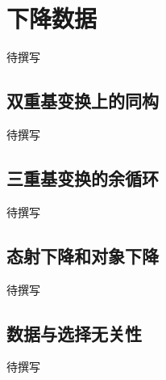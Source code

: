 
% 
% 

\section{下降数据}
\label{g5:sec:1601}

待撰写

\subsection{双重基变换上的同构}
\label{g5:subsec:1601:01}
待撰写

\subsection{三重基变换的余循环}
\label{g5:subsec:1601:02}
待撰写

\subsection{态射下降和对象下降}
\label{g5:subsec:1601:03}
待撰写

\subsection{数据与选择无关性}
\label{g5:subsec:1601:04}
待撰写
